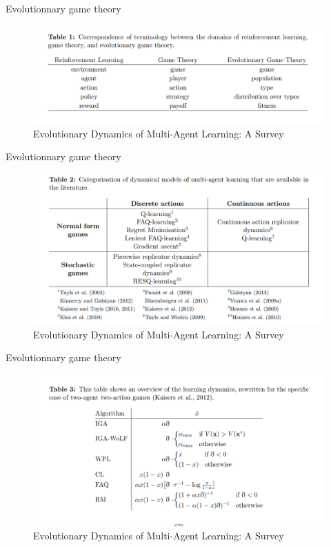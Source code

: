 \documentclass[aspectratio=169,xcolor=dvipsnames]{beamer}
\begin{document}
\begin{frame}{Evolutionnary game theory}
  \begin{figure}
    \centering
    \includegraphics[scale=0.30]{Terminology.png}
    \caption{\citet{bloembergen_evolutionary_2015} Evolutionary
Dynamics of Multi-Agent Learning: A Survey}
  \end{figure}

\end{frame}


\begin{frame}{Evolutionnary game theory}
  \begin{figure}
    \centering
    \includegraphics[scale=0.30]{Dynamics setting.png}
    \caption{\citet{bloembergen_evolutionary_2015} Evolutionary
Dynamics of Multi-Agent Learning: A Survey}
  \end{figure}
\end{frame}

\begin{frame}{Evolutionnary game theory}
  \begin{figure}
    \centering
    \includegraphics[scale=0.30]{Gradient.png}
    \caption{\citet{bloembergen_evolutionary_2015} Evolutionary
Dynamics of Multi-Agent Learning: A Survey}
  \end{figure}
\end{frame}
\end{document}
